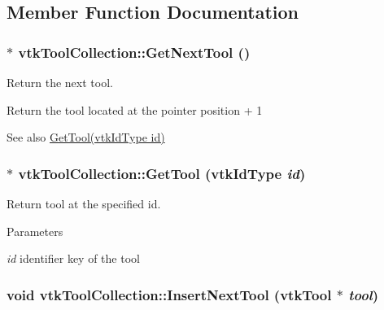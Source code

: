 \subsection{Member Function Documentation}
\hypertarget{classvtkToolCollection_ad58c5c348bd19de77143836948761d61}{
\subsubsection[{GetNextTool}]{ $\ast$ vtkToolCollection::GetNextTool ()}}
\label{classvtkToolCollection_ad58c5c348bd19de77143836948761d61}


Return the next tool. 

Return the tool located at the pointer position + 1 \begin{DoxySeeAlso}{See also}
\hyperlink{classvtkToolCollection_aaf3ad76ac0105f5f83775f189a56046b}{GetTool(vtkIdType id)} 
\end{DoxySeeAlso}
\hypertarget{classvtkToolCollection_aaf3ad76ac0105f5f83775f189a56046b}{
\subsubsection[{GetTool}]{ $\ast$ vtkToolCollection::GetTool (vtkIdType {\em id})}}
\label{classvtkToolCollection_aaf3ad76ac0105f5f83775f189a56046b}


Return tool at the specified id. 


\begin{DoxyParams}{Parameters}
\item[{\em id}]identifier key of the tool \end{DoxyParams}
\hypertarget{classvtkToolCollection_a77f6ddcba9da4caf9bd9204f20c1c6f2}{
\subsubsection[{InsertNextTool}]{\setlength{\rightskip}{0pt plus 5cm}void vtkToolCollection::InsertNextTool ({\bf vtkTool} $\ast$ {\em tool})}}
\label{classvtkToolCollection_a77f6ddcba9da4caf9bd9204f20c1c6f2}


